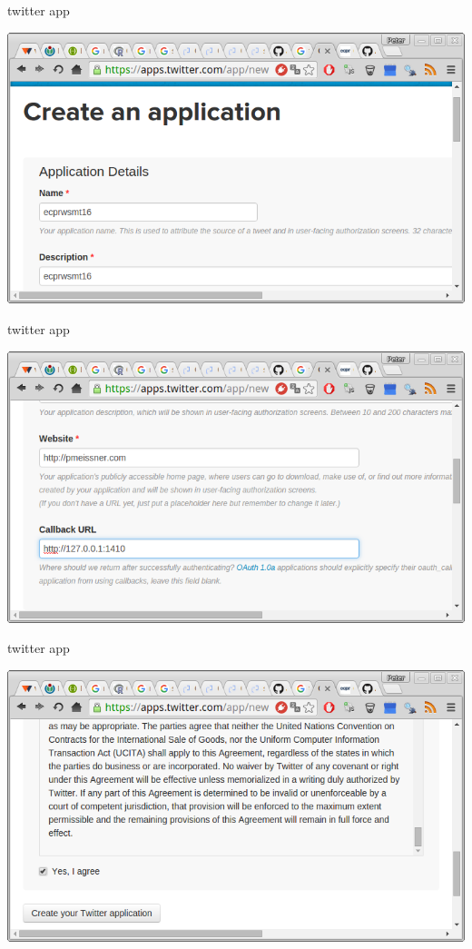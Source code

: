 \documentclass[ignorenonframetext,]{beamer}
\begin{document}
\begin{frame}{twitter app}

\includegraphics{fig/twitterapp2.png}

\end{frame}

\begin{frame}{twitter app}

\includegraphics{fig/twitterapp3.png}

\end{frame}

\begin{frame}{twitter app}

\includegraphics{fig/twitterapp4.png}

\end{frame}
\end{document}
